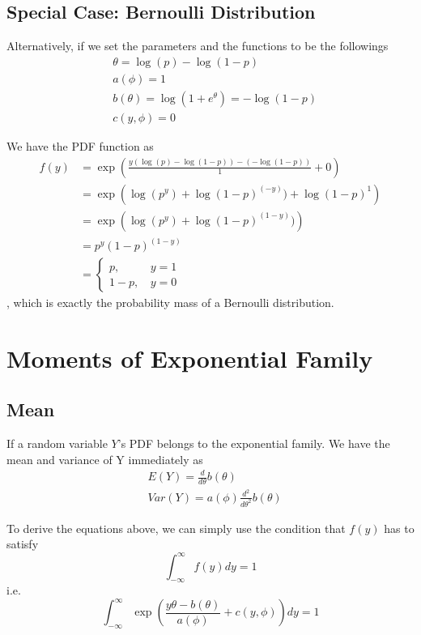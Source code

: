 \documentclass[12pt, oneside]{article}
\begin{document}
\subsection{Special Case: Bernoulli Distribution}
Alternatively, if we set the parameters and the functions to be the followings
\begin{align*}
&\theta=\log(p)-\log(1-p)\\
&a(\phi)=1\\
&b(\theta)=\log(1+e^\theta)=-\log(1-p)\\
&c(y,\phi)=0
\end{align*}

We have the PDF function as
\begin{align*}
{f(y)}&=\exp{\left( \frac{y(\log(p)-\log(1-p))-(-\log(1-p))}{1}+0\right)}\\
&=\exp{\left(\log(p^y)+\log(1-p)^{(-y)})+\log(1-p)^{1}\right)}\\
&=\exp{\left(\log(p^y)+\log(1-p)^{(1-y)})\right)}\\
&=p^y(1-p)^{(1-y)}\\
&=\begin{cases}
p \text{,  } &y=1\\
1-p \text{,  } &y=0
\end{cases}
\end{align*}
, which is exactly the probability mass of a Bernoulli distribution.

\section{Moments of Exponential Family}

\subsection{Mean}
If a random variable $Y$'s PDF belongs to the exponential family. We have the mean and variance of Y immediately as
\begin{align}
&E(Y)=\frac{d}{d\theta}b(\theta)\\
&Var(Y)=a(\phi)\frac{d^2}{d\theta^2}b(\theta)
\end{align}

To derive the equations above, we can simply use the condition that $f(y)$ has to satisfy
$$\int_{-\infty}^{\infty}f(y)dy=1$$ i.e.
\begin{equation}
\int_{-\infty}^{\infty}\exp{\left( \frac{y\theta-b(\theta)}{a(\phi)}+c(y, \phi)\right)}dy=1
\end{equation}
\end{document}
